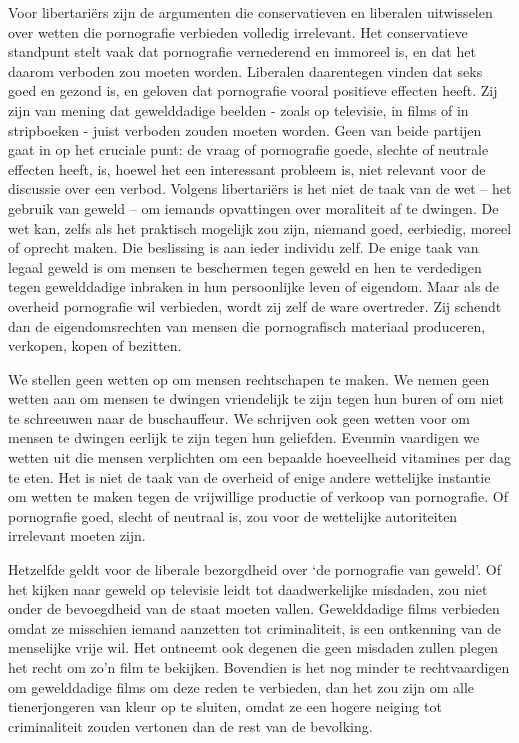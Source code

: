 \documentclass[
  a5paper,
  smalldemyvopaper,10pt,twoside,onecolumn,openright,extrafontsizes,hidelinks]{memoir}
\begin{document}
Voor libertariërs zijn de argumenten die conservatieven en liberalen
uitwisselen over wetten die pornografie verbieden volledig irrelevant.
Het conservatieve standpunt stelt vaak dat pornografie vernederend en
immoreel is, en dat het daarom verboden zou moeten worden. Liberalen
daarentegen vinden dat seks goed en gezond is, en geloven dat
pornografie vooral positieve effecten heeft. Zij zijn van mening dat
gewelddadige beelden - zoals op televisie, in films of in stripboeken -
juist verboden zouden moeten worden. Geen van beide partijen gaat in op
het cruciale punt: de vraag of pornografie goede, slechte of neutrale
effecten heeft, is, hoewel het een interessant probleem is, niet
relevant voor de discussie over een verbod. Volgens libertariërs is het
niet de taak van de wet -- het gebruik van geweld -- om iemands
opvattingen over moraliteit af te dwingen. De wet kan, zelfs als het
praktisch mogelijk zou zijn, niemand goed, eerbiedig, moreel of oprecht
maken. Die beslissing is aan ieder individu zelf. De enige taak van
legaal geweld is om mensen te beschermen tegen geweld en hen te
verdedigen tegen gewelddadige inbraken in hun persoonlijke leven of
eigendom. Maar als de overheid pornografie wil verbieden, wordt zij zelf
de ware overtreder. Zij schendt dan de eigendomsrechten van mensen die
pornografisch materiaal produceren, verkopen, kopen of bezitten.

We stellen geen wetten op om mensen rechtschapen te maken. We nemen geen
wetten aan om mensen te dwingen vriendelijk te zijn tegen hun buren of
om niet te schreeuwen naar de buschauffeur. We schrijven ook geen wetten
voor om mensen te dwingen eerlijk te zijn tegen hun geliefden. Evenmin
vaardigen we wetten uit die mensen verplichten om een bepaalde
hoeveelheid vitamines per dag te eten. Het is niet de taak van de
overheid of enige andere wettelijke instantie om wetten te maken tegen
de vrijwillige productie of verkoop van pornografie. Of pornografie
goed, slecht of neutraal is, zou voor de wettelijke autoriteiten
irrelevant moeten zijn.

Hetzelfde geldt voor de liberale bezorgdheid over `de pornografie van
geweld'. Of het kijken naar geweld op televisie leidt tot daadwerkelijke
misdaden, zou niet onder de bevoegdheid van de staat moeten vallen.
Gewelddadige films verbieden omdat ze misschien iemand aanzetten tot
criminaliteit, is een ontkenning van de menselijke vrije wil. Het
ontneemt ook degenen die geen misdaden zullen plegen het recht om zo'n
film te bekijken. Bovendien is het nog minder te rechtvaardigen om
gewelddadige films om deze reden te verbieden, dan het zou zijn om alle
tienerjongeren van kleur op te sluiten, omdat ze een hogere neiging tot
criminaliteit zouden vertonen dan de rest van de bevolking.
\end{document}
